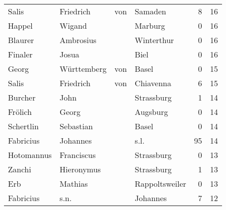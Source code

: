 \begin{center}
\begin{tiny}
\begin{longtabu}{llllrr}
                    Salis &                          Friedrich &         von &                                     Samaden &          8 &        16 \\
                   Happel &                             Wigand &             &                                     Marburg &          0 &        16 \\
                  Blaurer &                          Ambrosius &             &                                  Winterthur &          0 &        16 \\
                  Finaler &                              Josua &             &                                        Biel &          0 &        16 \\
                    Georg &                        Württemberg &         von &                                       Basel &          0 &        15 \\
                    Salis &                          Friedrich &         von &                                   Chiavenna &          6 &        15 \\
                  Burcher &                               John &             &                                  Strassburg &          1 &        14 \\
                  Frölich &                              Georg &             &                                    Augsburg &          0 &        14 \\
                Schertlin &                          Sebastian &             &                                       Basel &          0 &        14 \\
                Fabricius &                           Johannes &             &                                        s.l. &         95 &        14 \\
               Hotomannus &                         Franciscus &             &                                  Strassburg &          0 &        13 \\
                   Zanchi &                         Hieronymus &             &                                  Strassburg &          1 &        13 \\
                      Erb &                            Mathias &             &                              Rappoltsweiler &          0 &        13 \\
                Fabricius &                               s.n. &             &                                    Johannes &          7 &        12 \\

\end{longtabu}
\end{tiny}
\end{center}
